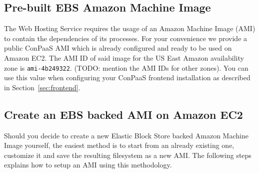 \documentclass[10pt]{article}
\begin{document}
\subsection{Pre-built EBS Amazon Machine Image}

The Web Hosting Service requires the usage of an Amazon Machine Image (AMI) to
contain the dependencies of its processes. For your convenience we provide a
public ConPaaS AMI which is already configured and ready to be used on Amazon
EC2. The AMI ID of said image for the US East Amazon availability zone is
\verb+ami-4b249322+. (TODO: mention the AMI IDs for other zones). You can use
this value when configuring your ConPaaS frontend installation as described in
Section~\ref{sec:frontend}.

\subsection{Create an EBS backed AMI on Amazon EC2}
\label{sec:ec2image}

Should you decide to create a new Elastic Block Store backed Amazon Machine
Image yourself, the easiest method is to start from an already existing one,
customize it and save the resulting filesystem as a new AMI. The following
steps explains how to setup an AMI using this methodology.
\end{document}
